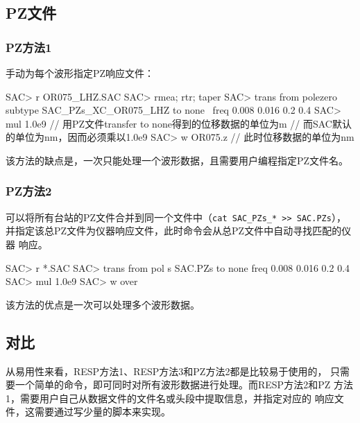 \subsection{PZ文件}

\subsubsection{PZ方法1}
手动为每个波形指定PZ响应文件：
\begin{SACCode}
SAC> r OR075_LHZ.SAC
SAC> rmea; rtr; taper
SAC> trans from polezero subtype SAC_PZs_XC_OR075_LHZ to none \
                        freq 0.008 0.016 0.2 0.4
SAC> mul 1.0e9      // 用PZ文件transfer to none得到的位移数据的单位为m
                    // 而SAC默认的单位为nm，因而必须乘以1.0e9
SAC> w OR075.z      // 此时位移数据的单位为nm
\end{SACCode}
该方法的缺点是，一次只能处理一个波形数据，且需要用户编程指定PZ文件名。

\subsubsection{PZ方法2}
可以将所有台站的PZ文件合并到同一个文件中（\verb|cat SAC_PZs_* >> SAC.PZs|），
并指定该总PZ文件为仪器响应文件，此时命令会从总PZ文件中自动寻找匹配的仪器
响应。
\begin{SACCode}
SAC> r *.SAC
SAC> trans from pol s SAC.PZs to none freq 0.008 0.016 0.2 0.4
SAC> mul 1.0e9
SAC> w over
\end{SACCode}
该方法的优点是一次可以处理多个波形数据。

\subsection{对比}
从易用性来看，RESP方法1、RESP方法3和PZ方法2都是比较易于使用的，
只需要一个简单的命令，即可同时对所有波形数据进行处理。而RESP方法2和PZ
方法1，需要用户自己从数据文件的文件名或头段中提取信息，并指定对应的
响应文件，这需要通过写少量的脚本来实现。

